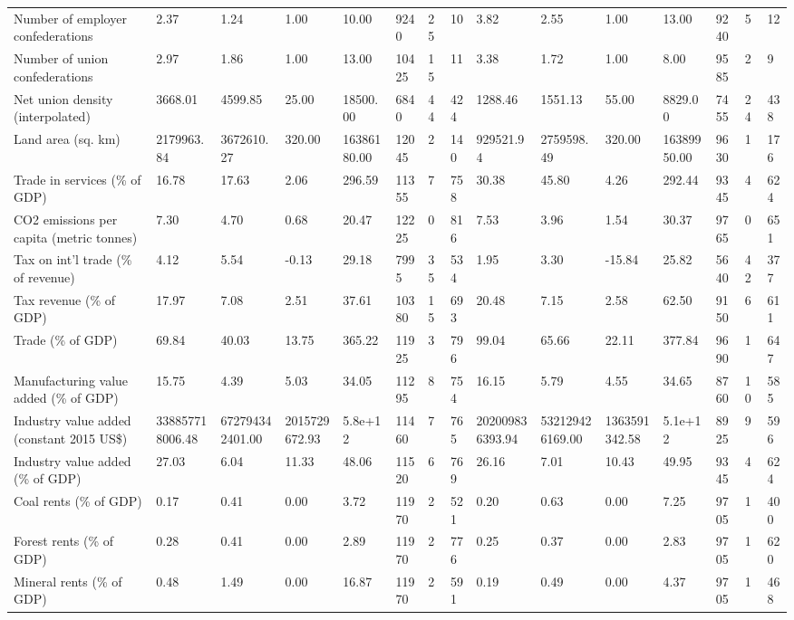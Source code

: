 \begin{longtable}{lllllllllllllll}
Number of employer confederations & 2.37 & 1.24 & 1.00 & 10.00 & 9240 & 25 & 10 & 3.82 & 2.55 & 1.00 & 13.00 & 9240 & 5 & 12\\
Number of union confederations & 2.97 & 1.86 & 1.00 & 13.00 & 10425 & 15 & 11 & 3.38 & 1.72 & 1.00 & 8.00 & 9585 & 2 & 9\\
Net union density (interpolated) & 3668.01 & 4599.85 & 25.00 & 18500.00 & 6840 & 44 & 424 & 1288.46 & 1551.13 & 55.00 & 8829.00 & 7455 & 24 & 438\\
Land area (sq. km) & 2179963.84 & 3672610.27 & 320.00 & 16386180.00 & 12045 & 2 & 140 & 929521.94 & 2759598.49 & 320.00 & 16389950.00 & 9630 & 1 & 176\\
\addlinespace
Trade in services (\% of GDP) & 16.78 & 17.63 & 2.06 & 296.59 & 11355 & 7 & 758 & 30.38 & 45.80 & 4.26 & 292.44 & 9345 & 4 & 624\\
CO2 emissions per capita (metric tonnes) & 7.30 & 4.70 & 0.68 & 20.47 & 12225 & 0 & 816 & 7.53 & 3.96 & 1.54 & 30.37 & 9765 & 0 & 651\\
Tax on int'l trade (\% of revenue) & 4.12 & 5.54 & -0.13 & 29.18 & 7995 & 35 & 534 & 1.95 & 3.30 & -15.84 & 25.82 & 5640 & 42 & 377\\
Tax revenue (\% of GDP) & 17.97 & 7.08 & 2.51 & 37.61 & 10380 & 15 & 693 & 20.48 & 7.15 & 2.58 & 62.50 & 9150 & 6 & 611\\
Trade (\% of GDP) & 69.84 & 40.03 & 13.75 & 365.22 & 11925 & 3 & 796 & 99.04 & 65.66 & 22.11 & 377.84 & 9690 & 1 & 647\\
\addlinespace
Manufacturing value added (\% of GDP) & 15.75 & 4.39 & 5.03 & 34.05 & 11295 & 8 & 754 & 16.15 & 5.79 & 4.55 & 34.65 & 8760 & 10 & 585\\
Industry value added (constant 2015 US\$) & 338857718006.48 & 672794342401.00 & 2015729672.93 & 5.8e+12 & 11460 & 7 & 765 & 202009836393.94 & 532129426169.00 & 1363591342.58 & 5.1e+12 & 8925 & 9 & 596\\
Industry value added (\% of GDP) & 27.03 & 6.04 & 11.33 & 48.06 & 11520 & 6 & 769 & 26.16 & 7.01 & 10.43 & 49.95 & 9345 & 4 & 624\\
Coal rents (\% of GDP) & 0.17 & 0.41 & 0.00 & 3.72 & 11970 & 2 & 521 & 0.20 & 0.63 & 0.00 & 7.25 & 9705 & 1 & 400\\
Forest rents (\% of GDP) & 0.28 & 0.41 & 0.00 & 2.89 & 11970 & 2 & 776 & 0.25 & 0.37 & 0.00 & 2.83 & 9705 & 1 & 620\\
\addlinespace
Mineral rents (\% of GDP) & 0.48 & 1.49 & 0.00 & 16.87 & 11970 & 2 & 591 & 0.19 & 0.49 & 0.00 & 4.37 & 9705 & 1 & 468\\

\end{longtable}
